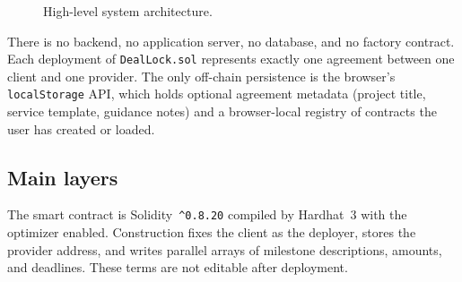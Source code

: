 \documentclass[12pt,a4paper]{article}
\begin{document}
\begin{figure}[H]
\centering
{}
\caption{High-level system architecture.}
\label{fig:arch}
\end{figure}

There is no backend, no application server, no database, and no factory contract.
Each deployment of \texttt{DealLock.sol} represents exactly one agreement between
one client and one provider.
The only off-chain persistence is the browser's \texttt{localStorage} API, which
holds optional agreement metadata (project title, service template, guidance notes)
and a browser-local registry of contracts the user has created or loaded.

\subsection{Main layers}

The smart contract is Solidity~\verb|^0.8.20| compiled by Hardhat~3 with the
optimizer enabled. Construction fixes the client as the deployer, stores the
provider address, and writes parallel arrays of milestone descriptions, amounts,
and deadlines. These terms are not editable after deployment.
\end{document}
